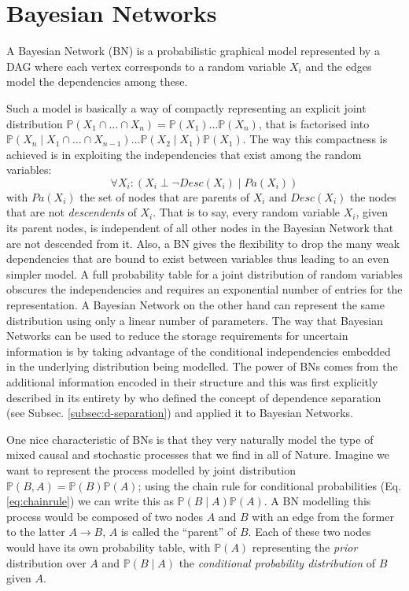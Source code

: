 \section{Bayesian Networks} \label{sec:bayesiannetworks}
\begin{definition}
	A Bayesian Network (BN) is a probabilistic graphical model represented by a DAG where each vertex corresponds to a random variable $X_i$ and the edges model the dependencies among these.
\end{definition}
Such a model is basically a way of compactly representing an explicit joint distribution $\mathbb{P}(X_1 \cap \ldots \cap X_n) = \mathbb{P}(X_1) \ldots \mathbb{P}(X_n)$, that is factorised into $\mathbb{P}(X_n \mid X_1 \cap \ldots \cap X_{n-1}) \ldots \mathbb{P}(X_2 \mid X_1 ) \mathbb{P}(X_1) $.
The way this compactness is achieved is in exploiting the independencies that exist among the random variables:
\begin{equation} \label{eq:bnindependencies}
	\forall X_i:  ( X_i \perp \neg Desc(X_i) \mid Pa(X_i))
\end{equation}
with $Pa(X_i)$ the set of nodes that are parents of $X_i$ and $Desc(X_i)$ the nodes that are not \textit{descendents} of $X_i$.
That is to say, every random variable $X_i$, given its parent nodes, is independent of all other nodes in the Bayesian Network that are not descended from it.
Also, a BN gives the flexibility to drop the many weak dependencies that are bound to exist between variables thus leading to an even simpler model.
A full probability table for a joint distribution of random variables obscures the independencies and requires an exponential number of entries for the representation.
A Bayesian Network on the other hand can represent the same distribution using only a linear number of parameters.
The way that Bayesian Networks can be used to reduce the storage requirements for uncertain information is by taking advantage of the conditional independencies embedded in the underlying distribution being modelled.
The power of BNs comes from the additional information encoded in their structure and this was first explicitly described in its entirety by \cite{Pearl1988} who defined the concept of dependence separation (see Subsec. \ref{subsec:d-separation}) and applied it to Bayesian Networks.

One nice characteristic of BNs is that they very naturally model the type of mixed causal and stochastic processes that we find in all of Nature.
Imagine we want to represent the process modelled by joint distribution $\mathbb{P}(B,A) = \mathbb{P}(B) \mathbb{P}(A)$; using the chain rule for conditional probabilities (Eq. \ref{eq:chainrule}) we can write this as $\mathbb{P}(B \mid A) \mathbb{P}(A)$.
A BN modelling this process would be composed of two nodes $A$ and $B$ with an edge from the former to the latter $A \rightarrow B$, $A$ is called the ``parent'' of $B$.  Each of these two nodes would have its own probability table, with $\mathbb{P}(A)$ representing the \textit{prior} distribution over $A$ and $\mathbb{P}(B \mid A)$ the \textit{conditional probability distribution} of $B$ given $A$.

